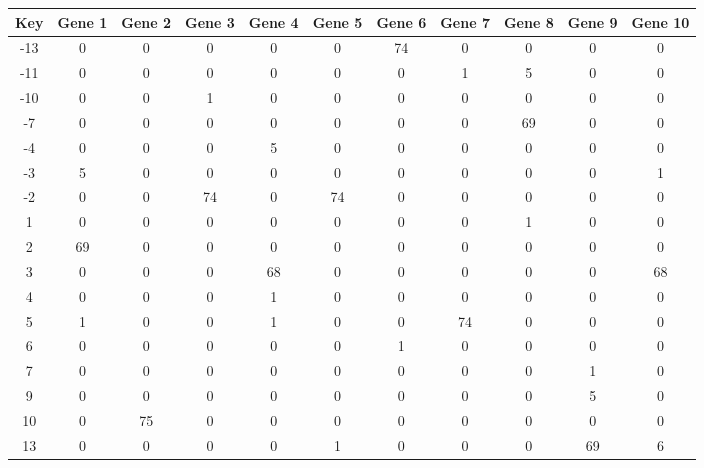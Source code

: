 \begin{tabular}{|c|c|c|c|c|c|c|c|c|c|c|}
\hline
Key & Gene 1 & Gene 2 & Gene 3 & Gene 4 & Gene 5 & Gene 6 & Gene 7 & Gene 8 & Gene 9 & Gene 10 \\
\hline
-13 & 0 & 0 & 0 & 0 & 0 & 74 & 0 & 0 & 0 & 0 \\
-11 & 0 & 0 & 0 & 0 & 0 & 0 & 1 & 5 & 0 & 0 \\
-10 & 0 & 0 & 1 & 0 & 0 & 0 & 0 & 0 & 0 & 0 \\
-7 & 0 & 0 & 0 & 0 & 0 & 0 & 0 & 69 & 0 & 0 \\
-4 & 0 & 0 & 0 & 5 & 0 & 0 & 0 & 0 & 0 & 0 \\
-3 & 5 & 0 & 0 & 0 & 0 & 0 & 0 & 0 & 0 & 1 \\
-2 & 0 & 0 & 74 & 0 & 74 & 0 & 0 & 0 & 0 & 0 \\
1 & 0 & 0 & 0 & 0 & 0 & 0 & 0 & 1 & 0 & 0 \\
2 & 69 & 0 & 0 & 0 & 0 & 0 & 0 & 0 & 0 & 0 \\
3 & 0 & 0 & 0 & 68 & 0 & 0 & 0 & 0 & 0 & 68 \\
4 & 0 & 0 & 0 & 1 & 0 & 0 & 0 & 0 & 0 & 0 \\
5 & 1 & 0 & 0 & 1 & 0 & 0 & 74 & 0 & 0 & 0 \\
6 & 0 & 0 & 0 & 0 & 0 & 1 & 0 & 0 & 0 & 0 \\
7 & 0 & 0 & 0 & 0 & 0 & 0 & 0 & 0 & 1 & 0 \\
9 & 0 & 0 & 0 & 0 & 0 & 0 & 0 & 0 & 5 & 0 \\
10 & 0 & 75 & 0 & 0 & 0 & 0 & 0 & 0 & 0 & 0 \\
13 & 0 & 0 & 0 & 0 & 1 & 0 & 0 & 0 & 69 & 6 \\
\hline
\end{tabular}